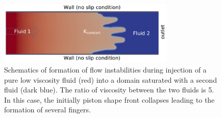 \clearpage

\begin{figure}[h]
\centering
\vbox{\includegraphics[width=0.75\textwidth]{./Pics/phase_vol_frac_uni_perm_1.pdf}}
\caption{Schematics of formation of flow instabilities during injection of a pure low viscosity fluid (red) into a domain saturated with a second fluid (dark blue). The ratio of viscosity between the two fluids is 5. In this case, the initially piston shape front collapses leading to the formation of several fingers.}
\label{fig:simple_case}
\end{figure}
\clearpage



